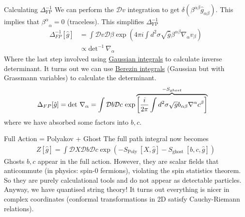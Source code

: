 \documentclass{beamer}
\begin{document}
\begin{frame}{Calculating $\Delta_{\text{FP}}^{-1}$}
    We can perform the $\mathcal{D}v$ integration to get $\delta(\beta^{\alpha\beta} \hat{g}_{\alpha\beta})$. This implies that ${\beta^{\alpha}}_\alpha=0$ (traceless). This simplifies $\Delta_{\text{FP}}^{-1}$
    \begin{align}
        \Delta_{F P}^{-1}[\hat{g}]&=\int \mathcal{D} v \mathcal{D} \beta \exp \left(4 \pi i \int d^2 \sigma \sqrt{\hat{g}} \beta^{\alpha \beta} \nabla_\alpha v_\beta\right)\\
        &\propto \text{det}^{-1}\ \nabla_\alpha 
    \end{align}
    Where the last step involved using \href{https://en.wikipedia.org/wiki/Gaussian_integral}{Gaussian integrals} to calculate inverse determinant. It turns out we can use \href{https://en.wikipedia.org/wiki/Berezin_integral}{Berezin integrals} (Gaussian but with Grassmann variables) to calculate the determinant.
    \begin{align}
        \Delta_{F P}[\hat{g}] &= \text{det }\nabla_\alpha
        =\int \mathcal{D} b \mathcal{D} c \text{ exp} \overbrace{\left[ \frac{i}{2\pi} \int d^2 \sigma \sqrt{g} b_{\alpha\beta} \nabla^\alpha c^\beta \right] }^{-S_{ghost}}  \notag
    \end{align}
    where we have absorbed some factors into $b,c$.
\end{frame}
\begin{frame}{Full Action = Polyakov + Ghost}
The full path integral now becomes
\begin{align}
    Z[\hat{g}]=\int \mathcal{D} X \mathcal{D} b \mathcal{D} c \exp \left(-S_{\text {Poly }}[X, \hat{g}]-S_{\text {ghost }}[b, c, \hat{g}]\right)
\end{align}
Ghosts $b,c$ appear in the full action. However, they are scalar fields that anticommute (in physics: spin-0 fermions), violating the spin statistics theorem. So they are purely calculational tools and do not appear as detectable particles. Anyway, we have quantised string theory! It turns out everything is nicer in complex coordinates (conformal transformations in 2D satisfy Cauchy-Riemann relations). 
\end{frame}
\end{document}
